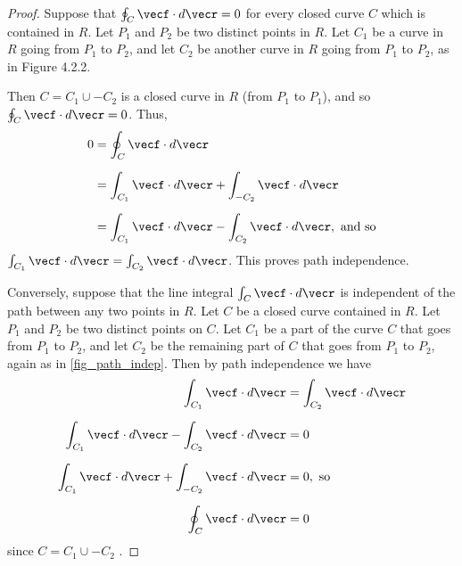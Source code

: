 
\begin{proof}
 Suppose that $\oint_{C}\vecf\cdot d\vecr = 0$ for every closed curve $C$  which is contained in $R$. Let $P_1$ and $P_2$ be two distinct points in $R$. Let $C_1$ be a curve in $R$ going from $P_1$ to $P_2$, and let $C_2$ be another curve in $R$ going from $P_1$ to $P_2$, as in Figure 4.2.2.
 
 
 Then $C = C_1\cup -C_2$ is a closed curve in $R$ (from $P_1$ to $P_1$), and so $\oint_{C}\vecf\cdot d\vecr = 0$. Thus,
 \begin{align*}
  0 &= \oint_{C}\vecf\cdot d\vecr\\[6pt]
   &= \int_{C_1}\vecf\cdot d\vecr + \int_{-C_2}\vecf\cdot d\vecr\\[6pt]
   &= \int_{C_1}\vecf\cdot d\vecr - \int_{C_2}\vecf\cdot d\vecr,\text{ and so}
 \end{align*}
 $\int_{C_1}\vecf\cdot d\vecr = \int_{C_2}\vecf\cdot d\vecr$. This proves path independence.

 Conversely, suppose that the line integral $\int_{C}\vecf\cdot d\vecr$ is independent of the path between any two points in $R$. Let $C$ be a closed curve contained in $R$. Let $P_1$ and $P_2$ be two distinct points on $C$. Let $C_1$ be a part of the curve $C$ that goes from $P_1$ to $P_2$, and let $C_2$ be the remaining part of $C$ that goes from $P_1$ to $P_2$, again as in \autoref{fig_path_indep}. Then by path independence we have
 \begin{align*}
  \int_{C_1}\vecf\cdot d\vecr &= \int_{C_2}\vecf\cdot d\vecr\\[6pt]
  \int_{C_1}\vecf\cdot d\vecr - \int_{C_2}\vecf\cdot d\vecr &= 0\\[6pt]
  \int_{C_1}\vecf\cdot d\vecr + \int_{-C_2}\vecf\cdot d\vecr &= 0 ,\text{ so}\\[6pt]
  \oint_{C}\vecf\cdot d\vecr &= 0
 \end{align*}
 since $C = C_1\cup -C_2$ .
\end{proof}

